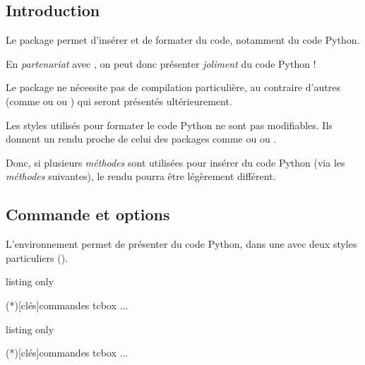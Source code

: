 \subsection{Introduction}

\begin{tipblock}
Le {package}  permet d'insérer et de formater du code, notamment du code \textsf{Python}.

En \textit{partenariat} avec , on peut donc présenter \textit{joliment} du code \textsf{Python} !
\end{tipblock}

\begin{noteblock}
Le package  ne nécessite pas de compilation particulière, au contraire d'autres (comme  ou  ou ) qui seront présentés ultérieurement.
\end{noteblock}

\begin{noteblock}
Les styles utilisés pour formater le code \textsf{Python} ne sont pas modifiables. Ils donnent un rendu proche de celui des packages comme  ou  ou .

\smallskip

Donc, si plusieurs \textit{méthodes} sont utilisées pour insérer du code \textsf{Python} (via les \textit{méthodes} suivantes), le rendu pourra être légèrement différent.
\end{noteblock}

\subsection{Commande et options}

\begin{tipblock}
L'environnement  permet de présenter du code \textsf{Python}, dans une  avec deux styles particuliers ().
\end{tipblock}

\begin{PresCodeTexPL}{listing only}
\begin{CodePythonLst}(*)[clés]{commandes tcbox}
...
\end{CodePythonLst}
\end{PresCodeTexPL}

\begin{PresCodeTexPL}{listing only}
\begin{CodePythonLstAlt}(*)[clés]{commandes tcbox}
...
\end{CodePythonLstAlt}
\end{PresCodeTexPL}


